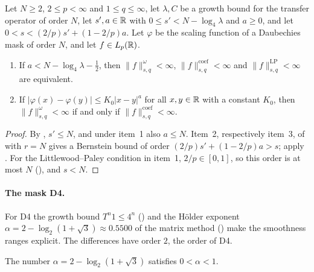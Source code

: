\begin{corollary}
\label{cor:daub-besov-two-le}
\leanok
{}
Let $N \geq 2$, $2 \leq p < \infty$ and $1 \leq q \leq \infty$, let $\lambda, C$ be a growth bound
for the transfer operator of order $N$, let $s', a \in \mathbb{R}$ with $0 \leq s' < N - \log_4 \lambda$
and $a \geq 0$, and let $0 < s < (2/p) s' + (1 - 2/p) a$. Let $\varphi$ be the scaling function of
a Daubechies mask of order $N$, and let $f \in L_p(\mathbb{R})$.
\begin{enumerate}
  \item If $a < N - \log_4 \lambda - \frac12$, then $\|f\|^{\omega}_{s,q} < \infty$,
    $\|f\|^{\mathrm{coef}}_{s,q} < \infty$ and $\|f\|^{\mathrm{LP}}_{s,q} < \infty$ are
    equivalent.
  \item If $|\varphi(x) - \varphi(y)| \leq K_0 |x - y|^a$ for all $x, y \in \mathbb{R}$ with a constant
    $K_0$, then $\|f\|^{\omega}_{s,q} < \infty$ if and only if
    $\|f\|^{\mathrm{coef}}_{s,q} < \infty$.
\end{enumerate}
\end{corollary}

\begin{proof}
\leanok
{}
By , $s' \leq N$, and under item~1 also $a \leq N$. Item~2,
respectively item~3, of  with $r = N$ gives a Bernstein bound of
order $(2/p) s' + (1 - 2/p) a > s$; apply . For the Littlewood--Paley
condition in item~1, $2/p \in [0, 1]$, so this order is at most $N$
(), and $s < N$.
\end{proof}

\paragraph{The mask D4.}
For D4 the growth bound $T^n 1 \leq 4^n$ () and the H\"older
exponent $\alpha = 2 - \log_2(1 + \sqrt 3) \approx 0.5500$ of the matrix method
() make the smoothness ranges explicit. The differences have order $2$,
the order of D4.

\begin{lemma}
\label{lem:daub-d4-alpha-bounds}
\leanok
The number $\alpha = 2 - \log_2(1 + \sqrt 3)$ satisfies $0 < \alpha < 1$.
\end{lemma}

